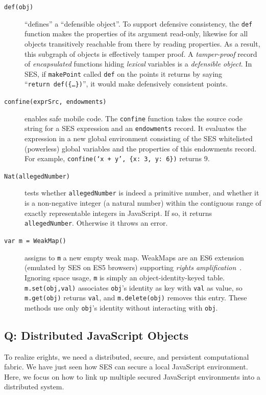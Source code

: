 \documentclass{llncs}
\begin{document}
\begin{description}
\item[{\tt def(obj)}]  ``defines'' a ``defensible object''. To support defensive consistency, the {\tt def} function makes the properties of its argument read-only, likewise for all objects transitively reachable from there by reading properties. As a result, this subgraph of objects is effectively tamper proof. A \emph{tamper-proof} record of \emph{encapsulated} functions hiding \emph{lexical} variables is a \emph{defensible object}. In SES, if {\tt makePoint} called {\tt def} on the points it returns by saying ``{\tt return~def(\{\ldots\})}'', it would make defensively consistent points.

\item[{\tt confine(exprSrc, endowments)}] enables safe mobile code. The {\tt confine} function takes the source code string for a SES expression and an {\tt endowments} record. It evaluates the expression in a new global environment consisting of the SES whitelisted (powerless) global variables and the properties of this endowments record. For example, {\tt confine(`x~+~y',~\{x:~3,~y:~6\})} returns 9.

\item[{\tt Nat(allegedNumber)}] tests whether {\tt allegedNumber} is indeed a primitive number, and whether it is a non-negative integer (a natural number) within the contiguous range of exactly representable integers in JavaScript. If so, it returns {\tt allegedNumber}. Otherwise it throws an error.

\item[{\tt var m = WeakMap()}] assigns to {\tt m} a new empty weak map. WeakMaps are an ES6 extension (emulated by SES on ES5 browsers) supporting \emph{rights amplification}~\cite{Jones:Thesis}. Ignoring space usage, {\tt m} is simply an object-identity-keyed table. {\tt m.set(obj,val)} associates {\tt obj}'s identity as key with {\tt val} as value, so {\tt m.get(obj)} returns {\tt val}, and {\tt m.delete(obj)} removes this entry. These methods use only {\tt obj}'s identity without interacting with {\tt obj}.


\end{description}

\subsection{Q: Distributed JavaScript Objects}
\label{Q}

To realize erights, we need a distributed, secure, and persistent computational fabric. We have just seen how SES can secure a local JavaScript environment. Here, we focus on how to link up multiple secured JavaScript environments into a distributed system.
\end{document}
